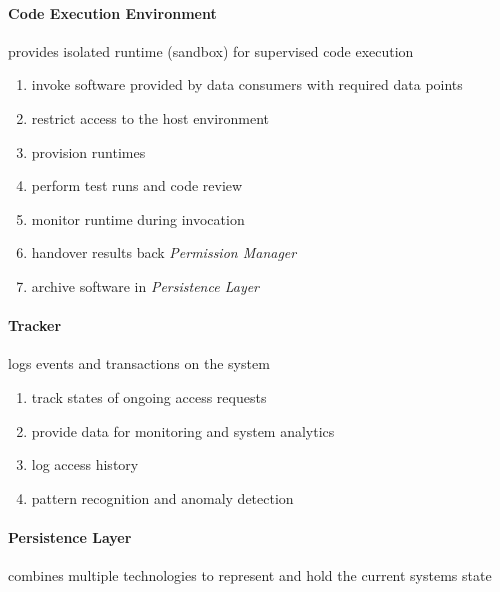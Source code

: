 \documentclass[12pt,english,a4paper,titlepage,cleardoublepage=empty,dottedtoc]{report}
\providecommand{\tightlist}{%
  \setlength{\itemsep}{0pt}\setlength{\parskip}{0pt}}
\begin{document}
\paragraph{Code Execution Environment}\label{code-execution-environment}

provides isolated runtime (sandbox) for supervised code execution

\begin{enumerate}
\def\labelenumi{\alph{enumi})}
\tightlist
\item
  invoke software provided by data consumers with required data points
\item
  restrict access to the host environment
\item
  provision runtimes
\item
  perform test runs and code review
\item
  monitor runtime during invocation
\item
  handover results back \emph{Permission Manager}
\item
  archive software in \emph{Persistence Layer}
\end{enumerate}

\paragraph{Tracker}\label{tracker}

logs events and transactions on the system

\begin{enumerate}
\def\labelenumi{\alph{enumi})}
\tightlist
\item
  track states of ongoing access requests
\item
  provide data for monitoring and system analytics
\item
  log access history
\item
  pattern recognition and anomaly detection
\end{enumerate}

\paragraph{Persistence Layer}\label{persistence-layer}

combines multiple technologies to represent and hold the current systems
state
\end{document}
